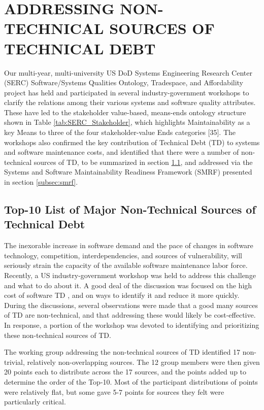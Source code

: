 \section{ADDRESSING NON-TECHNICAL SOURCES OF TECHNICAL DEBT}
\label{sec:smrf}

Our multi-year, multi-university US DoD Systems Engineering Research Center (SERC) Software/Systems Qualities Ontology, Tradespace, and Affordability project has held and participated in several industry-government workshops to clarify the relations among their various systems and software quality attributes.  These have led to the stakeholder value-based, means-ends ontology structure shown in Table \ref{tab:SERC_Stakeholder}, which highlights Maintainability as a key Means to three of the four stakeholder-value Ends categories [35].
The workshops also confirmed the key contribution of Technical Debt (TD) to systems and software maintenance costs, and identified that there were a number of non-technical sources of TD, to be summarized in section \ref{subsec:topten}, and addressed via the Systems and Software Maintainability Readiness Framework (SMRF) presented in section \ref{subsec:smrf}.


\subsection{Top-10 List of Major Non-Technical Sources of Technical Debt}
\label{subsec:topten}

The inexorable increase in software demand and the pace of changes in software technology, competition, interdependencies, and sources of vulnerability, will seriously strain the capacity of the available software maintenance labor force.
Recently, a US industry-government workshop was held to address this challenge and what to do about it.
A good deal of the discussion was focused on the high cost of software TD \citep{6336722}, and on ways to identify it and reduce it more quickly.
During the discussions, several observations were made that a good many sources of TD are non-technical, and that addressing these would likely be cost-effective.
In response, a portion of the workshop was devoted to identifying and prioritizing these non-technical sources of TD.

The working group addressing the non-technical sources of TD identified 17 non-trivial, relatively non-overlapping sources.
The 12 group members were then given 20 points each to distribute across the 17 sources, and the points added up to determine the order of the Top-10.
Most of the participant distributions of points were relatively flat, but some gave 5-7 points for sources they felt were particularly critical.

